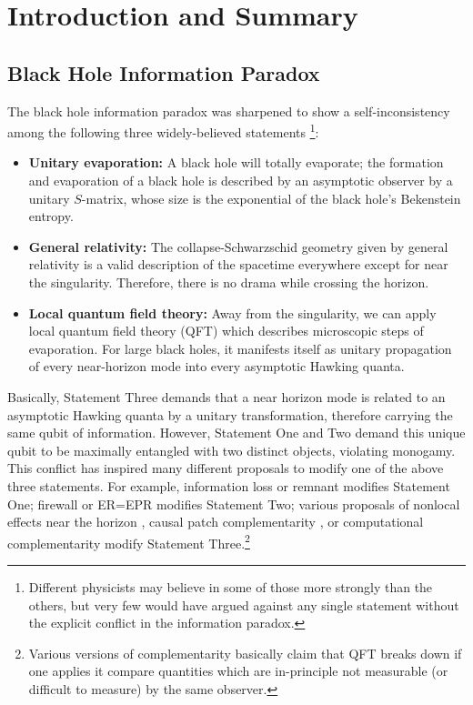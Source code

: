 \documentclass[aps,showpacs,onecolumn,floats,prd,superscriptaddress,nofootinbib]{revtex4-1}
\begin{document}
\maketitle


\section{Introduction and Summary}

\subsection{Black Hole Information Paradox}

The black hole information paradox \cite{Haw76a} was sharpened to show a self-inconsistency among the following three widely-believed statements \cite{AMPS}\footnote{Different physicists may believe in some of those more strongly than the others, but very few would have argued against any single statement without the explicit conflict in the information paradox.}:
\begin{itemize}
\item {\bf Unitary evaporation:} A black hole will totally evaporate; the formation and evaporation of a black hole is described by an asymptotic observer by a unitary $S$-matrix, whose size is the exponential of the black hole's Bekenstein entropy.
\item {\bf General relativity:} The collapse-Schwarzschid geometry given by general relativity is a valid description of the spacetime everywhere except for near the singularity.
Therefore, there is no drama while crossing the horizon.
\item {\bf Local quantum field theory:} Away from the singularity, we can apply local quantum field theory (QFT) which describes microscopic steps of evaporation. 
For large black holes, it manifests itself as unitary propagation of every near-horizon mode into every asymptotic Hawking quanta.
\end{itemize}
Basically, Statement Three demands that a near horizon mode is related to an asymptotic Hawking quanta by a unitary transformation, therefore carrying the same qubit of information. 
However, Statement One and Two demand this unique qubit to be maximally entangled with two distinct objects, violating monogamy. 
This conflict has inspired many different proposals to modify one of the above three statements. 
For example, information loss or remnant \cite{Bek94} modifies Statement One; 
firewall \cite{BraPir09,AMPS} or ER=EPR \cite{MalSus13} modifies Statement Two;
various proposals of nonlocal effects near the horizon \cite{Gid12,DodSil15,OsuPag16}, causal patch complementarity \cite{HuiYan13,IlgYan13,LowTho14}, or computational complementarity \cite{HH} modify Statement Three.\footnote{Various versions of complementarity basically claim that QFT breaks down if one applies it compare quantities which are in-principle not measurable (or difficult to measure) by the same observer.} 
\end{document}

